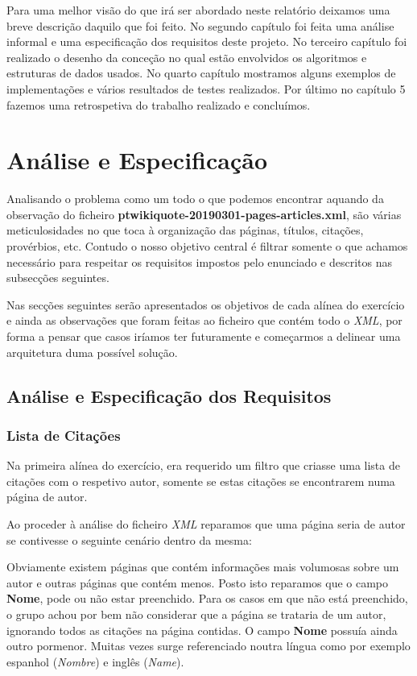 \documentclass[11pt,a4paper]{report}
\begin{document}
Para uma melhor visão do que irá ser abordado neste relatório deixamos uma breve descrição daquilo que foi feito. No segundo capítulo foi feita uma análise informal e uma especificação dos requisitos deste projeto. No terceiro capítulo foi realizado o desenho da conceção no qual estão envolvidos os algoritmos e estruturas de dados usados. No quarto capítulo mostramos alguns exemplos de implementações e vários resultados de testes realizados. Por último no capítulo 5 fazemos uma retrospetiva do trabalho realizado e concluímos.



\chapter{Análise e Especificação}
\label{chap:analise}

Analisando o problema como um todo o que podemos encontrar aquando da observação do ficheiro \textbf{ptwikiquote-20190301-pages-articles.xml}, são várias meticulosidades no que toca à organização das páginas, títulos, citações, provérbios, etc. Contudo o nosso objetivo central é filtrar somente o que achamos necessário para respeitar os requisitos impostos pelo enunciado e descritos nas subsecções seguintes.

Nas secções seguintes serão apresentados os objetivos de cada alínea do exercício e ainda as observações que foram feitas ao ficheiro que contém todo o \emph{XML}, por forma a pensar que casos iríamos ter futuramente e começarmos a delinear uma arquitetura duma possível solução.

\section{Análise e Especificação dos Requisitos}
\subsection{Lista de Citações}

Na primeira alínea do exercício, era requerido um filtro que criasse uma lista de citações com o respetivo autor, somente se estas citações se encontrarem numa página de autor.

Ao proceder à análise do ficheiro \emph{XML} reparamos que uma página seria de autor se contivesse o seguinte cenário dentro da mesma:


Obviamente existem páginas que contém informações mais volumosas sobre um autor e outras páginas que contém menos. Posto isto reparamos que o campo \textbf{Nome}, pode ou não estar preenchido. Para os casos em que não está preenchido, o grupo achou por bem não considerar que a página se trataria de um autor, ignorando todos as citações na página contidas. O campo \textbf{Nome} possuía ainda outro pormenor. Muitas vezes surge referenciado noutra língua como por exemplo espanhol (\emph{Nombre}) e inglês (\emph{Name}).
\end{document}
